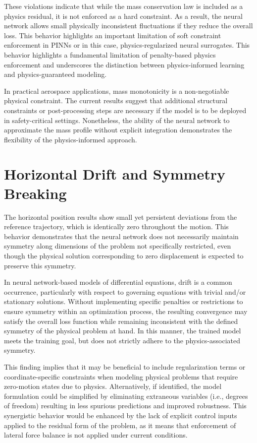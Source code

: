 These violations indicate that while the mass conservation law is included as a physics 
residual, it is not enforced as a hard constraint. As a result, the neural network allows small 
physically inconsistent fluctuations if they reduce the overall loss. This behavior highlights 
an important limitation of soft constraint enforcement in PINNs or  in this case, physics-regularized 
neural surrogates. This behavior highlights a fundamental limitation of penalty-based physics 
enforcement and underscores the distinction between physics-informed learning and 
physics-guaranteed modeling.

In practical aerospace applications, mass monotonicity is a non-negotiable physical constraint. 
The current results suggest that additional structural constraints or post-processing steps 
are necessary if the model is to be deployed in safety-critical settings. Nonetheless, the 
ability of the neural network to approximate the mass profile without explicit integration 
demonstrates the flexibility of the physics-informed approach.

\section{Horizontal Drift and Symmetry Breaking}

The horizontal position results show small yet persistent deviations from the reference trajectory, 
which is identically zero throughout the motion. This behavior demonstrates that the neural network 
does not necessarily maintain symmetry along dimensions of the problem not specifically restricted, 
even though the physical solution corresponding to zero displacement is expected to preserve this symmetry.

In neural network-based models of differential equations, drift is a common occurrence, particularly 
with respect to governing equations with trivial and/or stationary solutions. Without implementing 
specific penalties or restrictions to ensure symmetry within an optimization process, the resulting 
convergence may satisfy the overall loss function while remaining inconsistent with the defined symmetry 
of the physical problem at hand. In this manner, the trained model meets the training goal, but does not 
strictly adhere to the physics-associated symmetry.

This finding implies that it may be beneficial to include regularization terms or coordinate-specific 
constraints when modeling physical problems that require zero-motion states due to physics. Alternatively, 
if identified, the model formulation could be simplified by eliminating extraneous variables (i.e., degrees of 
freedom) resulting in less spurious predictions and improved robustness. This synergistic behavior would be 
enhanced by the lack of explicit control inputs applied to the residual form of the problem, as it means that 
enforcement of lateral force balance is not applied under current conditions.

